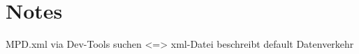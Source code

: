 \documentclass[11pt, a4paper]{article}
\begin{document}
    \graphicspath{{3.1/}{3.2/}{3.3/}{3.4/}{3.5/}}
    
    
    
    
    
    \section{Notes}
    MPD.xml via Dev-Tools suchen <=> xml-Datei beschreibt default Datenverkehr
\end{document}
